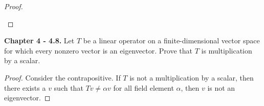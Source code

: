 \documentclass[10pt]{report}
\theoremstyle{definition}
\begin{document}
\begin{proof}
\begin{enumerate}[label=(\alph*)]
%
%
%
\end{enumerate}
\end{proof}

\textbf{Chapter 4 - 4.8.} Let $T$ be a linear operator on a finite-dimensional vector space for which every nonzero vector is an eigenvector. Prove that $T$ is multiplication by a scalar.
\begin{proof}
Consider the contrapositive. If $T$ is not a multiplication by a scalar, then there exists a $v$ such that $Tv\neq\alpha v$ for all field element $\alpha$, then $v$ is not an eigenvector.
\end{proof}
\end{document}
